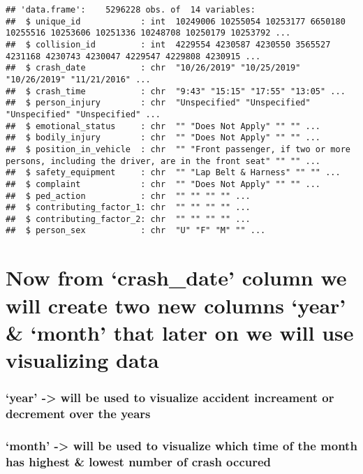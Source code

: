 \documentclass[
]{article}
\begin{document}
\begin{verbatim}
## 'data.frame':    5296228 obs. of  14 variables:
##  $ unique_id            : int  10249006 10255054 10253177 6650180 10255516 10253606 10251336 10248708 10250179 10253792 ...
##  $ collision_id         : int  4229554 4230587 4230550 3565527 4231168 4230743 4230047 4229547 4229808 4230915 ...
##  $ crash_date           : chr  "10/26/2019" "10/25/2019" "10/26/2019" "11/21/2016" ...
##  $ crash_time           : chr  "9:43" "15:15" "17:55" "13:05" ...
##  $ person_injury        : chr  "Unspecified" "Unspecified" "Unspecified" "Unspecified" ...
##  $ emotional_status     : chr  "" "Does Not Apply" "" "" ...
##  $ bodily_injury        : chr  "" "Does Not Apply" "" "" ...
##  $ position_in_vehicle  : chr  "" "Front passenger, if two or more persons, including the driver, are in the front seat" "" "" ...
##  $ safety_equipment     : chr  "" "Lap Belt & Harness" "" "" ...
##  $ complaint            : chr  "" "Does Not Apply" "" "" ...
##  $ ped_action           : chr  "" "" "" "" ...
##  $ contributing_factor_1: chr  "" "" "" "" ...
##  $ contributing_factor_2: chr  "" "" "" "" ...
##  $ person_sex           : chr  "U" "F" "M" "" ...
\end{verbatim}

\hypertarget{now-from-crash_date-column-we-will-create-two-new-columns-year-month-that-later-on-we-will-use-visualizing-data}{%
\section{Now from `crash\_date' column we will create two new columns
`year' \& `month' that later on we will use visualizing
data}\label{now-from-crash_date-column-we-will-create-two-new-columns-year-month-that-later-on-we-will-use-visualizing-data}}

\hypertarget{year---will-be-used-to-visualize-accident-increament-or-decrement-over-the-years}{%
\subsubsection{`year' -\textgreater{} will be used to visualize accident
increament or decrement over the
years}\label{year---will-be-used-to-visualize-accident-increament-or-decrement-over-the-years}}

\hypertarget{month---will-be-used-to-visualize-which-time-of-the-month-has-highest-lowest-number-of-crash-occured}{%
\subsubsection{`month' -\textgreater{} will be used to visualize which
time of the month has highest \& lowest number of crash
occured}\label{month---will-be-used-to-visualize-which-time-of-the-month-has-highest-lowest-number-of-crash-occured}}
\end{document}
